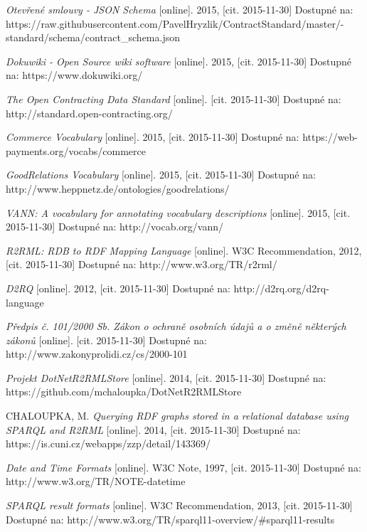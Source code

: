 \begin{thebibliography}{99}
  \emph{Otevřené smlouvy - JSON Schema} 
  [online]. 2015, [cit. 2015-11-30] Dostupné na: 
  https://raw.githubusercontent.com/PavelHryzlik/ContractStandard/master/- standard/schema/contract\_schema.json
  
  \emph{Dokuwiki - Open Source wiki software} 
  [online]. 2015, [cit. 2015-11-30] Dostupné na: 
  https://www.dokuwiki.org/
  
  \emph{The Open Contracting Data Standard} 
  [online]. [cit. 2015-11-30] Dostupné na: 
  http://standard.open-contracting.org/ 
  
  \emph{Commerce Vocabulary} 
  [online]. 2015, [cit. 2015-11-30] Dostupné na: 
  https://web-payments.org/vocabs/commerce
  
  \emph{GoodRelations Vocabulary} 
  [online]. 2015, [cit. 2015-11-30] Dostupné na: 
  http://www.heppnetz.de/ontologies/goodrelations/  
 
  \emph{VANN: A vocabulary for annotating vocabulary descriptions} 
  [online]. 2015, [cit. 2015-11-30] Dostupné na: 
  http://vocab.org/vann/

  \emph{R2RML: RDB to RDF Mapping Language} 
  [online]. W3C Recommendation, 2012, [cit. 2015-11-30] Dostupné na: 
  http://www.w3.org/TR/r2rml/
  
  \emph{D2RQ} 
  [online]. 2012, [cit. 2015-11-30] Dostupné na: 
  http://d2rq.org/d2rq-language  

  \emph{Předpis č. 101/2000 Sb. Zákon o ochraně osobních údajů a o změně některých zákonů} 
  [online]. [cit. 2015-11-30] Dostupné na: 
  http://www.zakonyprolidi.cz/cs/2000-101  
  
  \emph{Projekt DotNetR2RMLStore} 
  [online]. 2014, [cit. 2015-11-30] Dostupné na: 
  https://github.com/mchaloupka/DotNetR2RMLStore  
  
  CHALOUPKA, M.
  \emph{Querying RDF graphs stored in a relational database using SPARQL and R2RML} 
  [online]. 2014, [cit. 2015-11-30] Dostupné na: 
  https://is.cuni.cz/webapps/zzp/detail/143369/
  
  \emph{Date and Time Formats} 
  [online]. W3C Note, 1997, [cit. 2015-11-30] Dostupné na: 
  http://www.w3.org/TR/NOTE-datetime   
  
  \emph{SPARQL result formats} 
  [online]. W3C Recommendation, 2013, [cit. 2015-11-30] Dostupné na: 
  http://www.w3.org/TR/sparql11-overview/\#sparql11-results


\end{thebibliography}
